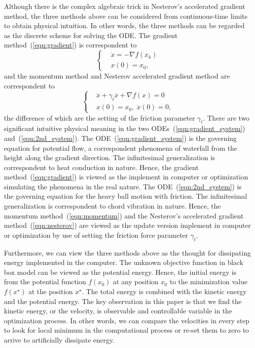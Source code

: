 \documentclass[11pt,fceqn]{article}
\numberwithin{equation}{section}
\theoremstyle{definition}
\begin{document}
Although there is the complex algebraic trick in Nesterov's accelerated gradient method, the three methods above can be considered from continuous-time limits~\citep{polyak1964some, su2014differential, wibisono2016variational, wilson2016lyapunov} to obtain physical intuition. In other words, the three methods can be regarded as the discrete scheme for solving the ODE. The gradient method~(\ref{eqn:gradient}) is correspondent to 
\begin{equation}
\label{eqn:gradient_system}
\left\{\begin{aligned}
& \dot{x} = - \nabla f(x_{k})\\
& x(0)= x_{0},
\end{aligned}\right.
\end{equation}
and the momentum method and Nesterov accelerated gradient method are correspondent to 
\begin{equation}
\label{eqn:2nd_system}
\left\{\begin{aligned}
& \ddot{x} + \gamma_{t} \dot{x} + \nabla f(x) = 0\\
& x(0)= x_{0}, \;\dot{x}(0) =0,
\end{aligned}\right.
\end{equation}
the difference of which are the setting of the friction parameter $\gamma_{t}$. There are two significant intuitive physical meaning in the two ODEs~(\ref{eqn:gradient_system}) and~(\ref{eqn:2nd_system}). The ODE~(\ref{eqn:gradient_system}) is the governing equation for potential flow, a correspondent phenomena of waterfall from the height along the gradient direction. The infinitesimal generalization is correspondent to heat conduction in nature. Hence, the gradient method~(\ref{eqn:gradient}) is viewed as the implement in computer or optimization simulating the phenomena in the real nature. The ODE~(\ref{eqn:2nd_system}) is the governing equation for the heavy ball motion with friction.  The infinitesimal generalization is correspondent to chord vibration in nature.  Hence, the momentum method~(\ref{eqn:momentum}) and the Nesterov's accelerated gradient method~(\ref{eqn:nesterov}) are viewed as the update version implement in computer or optimization by use of setting the friction force parameter $\gamma_{t}$.
     
Furthermore, we can view the three methods above as the thought for dissipating energy implemented in the computer. The unknown objective function in black box model can be viewed as the potential energy.  Hence, the initial energy is from the potential function $f(x_{0})$ at any position $x_{0}$ to the minimization value $f(x^{\star})$ at the position $x^{\star}$. The total energy is combined with the kinetic energy and the potential energy. The key observation in this paper is that we find the kinetic energy, or the velocity, is observable and controllable variable in the optimization process. In other words, we can compare the velocities in every step to look for local minimum in the computational process or re-set them to zero to arrive to artificially dissipate energy. 
\end{document}
